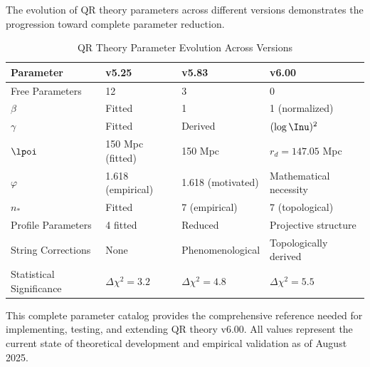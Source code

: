 The evolution of QR theory parameters across different versions demonstrates the progression toward complete parameter reduction.

\begin{table}[H]
  \caption{QR Theory Parameter Evolution Across Versions}
  \label{tab:parameter-evolution}
  \centering
  \begin{tabular}{@{}llll@{}}
    \toprule
    \textbf{Parameter} & \textbf{v5.25} & \textbf{v5.83} & \textbf{v6.00} \\
    \midrule
    Free Parameters     & 12 & 3 & 0 \\
    $\beta$             & Fitted & 1 & 1 (normalized) \\
    $\gamma$            & Fitted & Derived & $(\log \Inu)^2$ \\
    $\lpoi$             & 150 \si{Mpc} (fitted) & 150 \si{Mpc} & $r_d = 147.05$ \si{Mpc} \\
    $\varphi$           & 1.618 (empirical) & 1.618 (motivated) & Mathematical necessity \\
    $n_\ast$            & Fitted & 7 (empirical) & 7 (topological) \\
    Profile Parameters  & 4 fitted & Reduced & Projective structure \\
    String Corrections  & None & Phenomenological & Topologically derived \\
    Statistical Significance & $\Delta\chi^2 = 3.2$ & $\Delta\chi^2 = 4.8$ & $\Delta\chi^2 = 5.5$ \\
    \bottomrule
  \end{tabular}
\end{table}

This complete parameter catalog provides the comprehensive reference needed for implementing, testing, and extending QR theory v6.00. All values represent the current state of theoretical development and empirical validation as of August 2025.